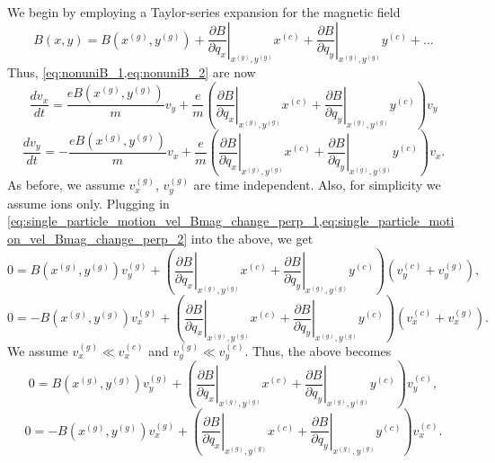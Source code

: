 \documentclass[a4paper,11pt]{report}
\begin{document}
We begin by employing a Taylor-series expansion for the magnetic field
\begin{equation}
    B(x,y) = B(x^{(g)}, y^{(g)}) + \left . \frac{\partial B}{\partial q_x} \right |_{x^{(g)},y^{(g)}} x^{(c)} + \left . \frac{\partial B}{\partial q_y} \right |_{x^{(g)},y^{(g)}} y^{(c)} + ...
\end{equation}
Thus, \cref{eq:nonuniB_1,eq:nonuniB_2} are now
\begin{equation}
    \frac{ d v_x}{dt} = \frac{e B(x^{(g)},y^{(g)})}{m} v_y + \frac{e}{m} \left ( \left . \frac{\partial B}{\partial q_x} \right|_{x^{(g)},y^{(g)}} x^{(c)} + \left . \frac{\partial B}{\partial q_y} \right |_{x^{(g)},y^{(g)}} y^{(c)} \right) v_y
\end{equation}
\begin{equation}
    \frac{ d v_y}{dt} = -\frac{e B(x^{(g)},y^{(g)})}{m} v_x + \frac{e}{m} \left ( \left . \frac{\partial B}{\partial q_x} \right|_{x^{(g)},y^{(g)}} x^{(c)} + \left . \frac{\partial B}{\partial q_y} \right |_{x^{(g)},y^{(g)}} y^{(c)} \right ) v_x.
\end{equation}
As before, we assume $v_x^{(g)}$, $v_y^{(g)}$ are time independent. Also, for simplicity we assume ions only. Plugging in \cref{eq:single_particle_motion_vel_Bmag_change_perp_1,eq:single_particle_motion_vel_Bmag_change_perp_2} into the above, we get
\begin{equation}
    0 = B(x^{(g)},y^{(g)}) v_y^{(g)} + \left ( \left . \frac{\partial B}{\partial q_x} \right|_{x^{(g)},y^{(g)}} x^{(c)} + \left . \frac{\partial B}{\partial q_y} \right |_{x^{(g)},y^{(g)}} y^{(c)} \right) \left ( v_y^{(c)} + v_y^{(g)} \right),
\end{equation}
\begin{equation}
    0 = -B(x^{(g)},y^{(g)}) v_x^{(g)} + \left ( \left . \frac{\partial B}{\partial q_x} \right|_{x^{(g)},y^{(g)}} x^{(c)} + \left . \frac{\partial B}{\partial q_y} \right |_{x^{(g)},y^{(g)}} y^{(c)} \right ) \left ( v_x^{(c)} + v_x^{(g)} \right ).
\end{equation}
We assume $v_x^{(g)} \ll v_x^{(c)}$ and $v_y^{(g)} \ll v_y^{(c)}$. Thus, the above becomes
\begin{equation}
    \label{eq:single_particle_motion_Bmag_change_perp_temp1}
    0 = B(x^{(g)},y^{(g)}) v_y^{(g)} + \left ( \left . \frac{\partial B}{\partial q_x} \right|_{x^{(g)},y^{(g)}} x^{(c)} + \left . \frac{\partial B}{\partial q_y} \right |_{x^{(g)},y^{(g)}} y^{(c)} \right) v_y^{(c)},
\end{equation}
\begin{equation}
    \label{eq:single_particle_motion_Bmag_change_perp_temp2}
    0 = -B(x^{(g)},y^{(g)}) v_x^{(g)} + \left ( \left . \frac{\partial B}{\partial q_x} \right|_{x^{(g)},y^{(g)}} x^{(c)} + \left . \frac{\partial B}{\partial q_y} \right |_{x^{(g)},y^{(g)}} y^{(c)} \right ) v_x^{(c)}.
\end{equation}
\end{document}
